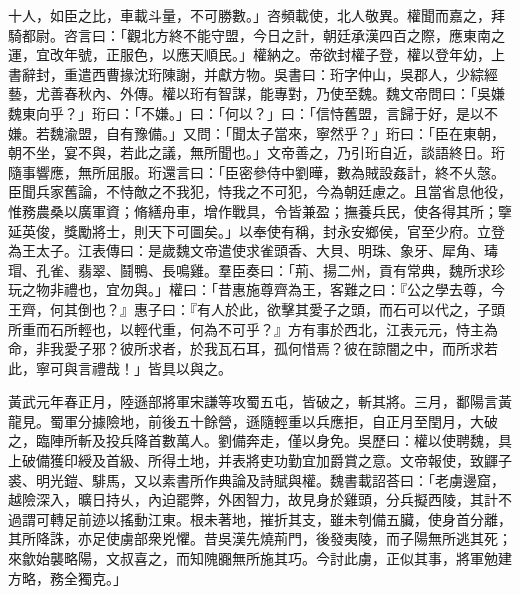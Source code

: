 \begin{pinyinscope}
十人，如臣之比，車載斗量，不可勝數。」咨頻載使，北人敬異。權聞而嘉之，拜騎都尉。咨言曰：「觀北方終不能守盟，今日之計，朝廷承漢四百之際，應東南之運，宜改年號，正服色，以應天順民。」權納之。帝欲封權子登，權以登年幼，上書辭封，重遣西曹掾沈珩陳謝，并獻方物。吳書曰：珩字仲山，吳郡人，少綜經藝，尤善春秋內、外傳。權以珩有智謀，能專對，乃使至魏。魏文帝問曰：「吳嫌魏東向乎？」珩曰：「不嫌。」曰：「何以？」曰：「信恃舊盟，言歸于好，是以不嫌。若魏渝盟，自有豫備。」又問：「聞太子當來，寧然乎？」珩曰：「臣在東朝，朝不坐，宴不與，若此之議，無所聞也。」文帝善之，乃引珩自近，談語終日。珩隨事響應，無所屈服。珩還言曰：「臣密參侍中劉曄，數為賊設姦計，終不乆愨。臣聞兵家舊論，不恃敵之不我犯，恃我之不可犯，今為朝廷慮之。且當省息他役，惟務農桑以廣軍資；脩繕舟車，增作戰具，令皆兼盈；撫養兵民，使各得其所；擥延英俊，獎勵將士，則天下可圖矣。」以奉使有稱，封永安鄉侯，官至少府。立登為王太子。江表傳曰：是歲魏文帝遣使求雀頭香、大貝、明珠、象牙、犀角、瑇瑁、孔雀、翡翠、鬪鴨、長鳴雞。羣臣奏曰：「荊、揚二州，貢有常典，魏所求珍玩之物非禮也，宜勿與。」權曰：「昔惠施尊齊為王，客難之曰：『公之學去尊，今王齊，何其倒也？』惠子曰：『有人於此，欲擊其愛子之頭，而石可以代之，子頭所重而石所輕也，以輕代重，何為不可乎？』方有事於西北，江表元元，恃主為命，非我愛子邪？彼所求者，於我瓦石耳，孤何惜焉？彼在諒闇之中，而所求若此，寧可與言禮哉！」皆具以與之。

黃武元年春正月，陸遜部將軍宋謙等攻蜀五屯，皆破之，斬其將。三月，鄱陽言黃龍見。蜀軍分據險地，前後五十餘營，遜隨輕重以兵應拒，自正月至閏月，大破之，臨陣所斬及投兵降首數萬人。劉備奔走，僅以身免。吳歷曰：權以使聘魏，具上破備獲印綬及首級、所得土地，并表將吏功勤宜加爵賞之意。文帝報使，致鼲子裘、明光鎧、騑馬，又以素書所作典論及詩賦與權。魏書載詔荅曰：「老虜邊窟，越險深入，曠日持乆，內迫罷弊，外困智力，故見身於雞頭，分兵擬西陵，其計不過謂可轉足前迹以搖動江東。根未著地，摧折其支，雖未刳備五臟，使身首分離，其所降誅，亦足使虜部衆兇懼。昔吳漢先燒荊門，後發夷陵，而子陽無所逃其死；來歙始襲略陽，文叔喜之，而知隗嚻無所施其巧。今討此虜，正似其事，將軍勉建方略，務全獨克。」


\end{pinyinscope}
